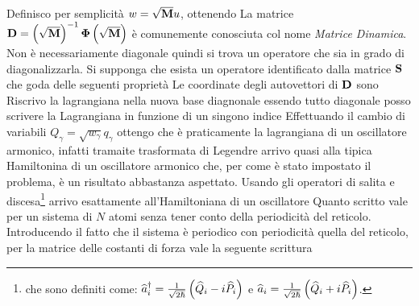\documentclass[a4paper,12pt]{article}
\begin{document}
Definisco per semplicità $w = \sqrt{{\it\bf M}} u$, ottenendo
La matrice ${\it\bf D} = \left(\sqrt{{\it\bf M}}\right)^{-1} {\it\bf \Phi} \left(\sqrt{{\it\bf M}}\right)$ è comunemente conosciuta col nome \textit{Matrice Dinamica}. Non è necessariamente diagonale quindi si trova un  operatore che sia in grado di diagonalizzarla. Si supponga che esista un operatore identificato dalla matrice $\it\bf S$ che goda delle seguenti proprietà
Le coordinate degli autovettori di ${\it\bf D}$ sono
Riscrivo la lagrangiana nella nuova base diagnonale
essendo tutto diagonale posso scrivere la Lagrangiana in funzione di un singono indice
Effettuando il cambio di variabili $Q_\gamma = \sqrt{w_\gamma} q_\gamma$ ottengo
che è praticamente la lagrangiana di un oscillatore armonico, infatti tramaite trasformata di Legendre arrivo quasi alla tipica Hamiltonina di un oscillatore armonico
che, per come è stato impostato il problema,  è un risultato abbastanza aspettato. Usando gli operatori di salita e discesa\footnote{che sono definiti come: $\op{a} _i^\dagger =\frac{1}{\sqrt{2\hbar}} \left(\op{Q} _i - i\op{P} _i\right)$ e $\op{a} _i = \frac{1}{\sqrt{2\hbar}} \left(\op{Q} _i + i \op{P} _i\right)  $. }  arrivo esattamente all'Hamiltoniana di un oscillatore
Quanto scritto vale per un sistema di $N$ atomi senza tener conto della periodicità del reticolo. Introducendo il fatto che il sistema è periodico con periodicità quella del reticolo, per la matrice delle costanti di forza vale la seguente scrittura
\end{document}

